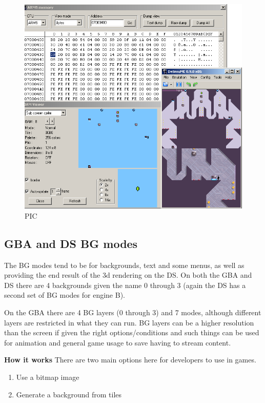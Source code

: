 \documentclass[
]{book}
\providecommand{\tightlist}{%
  \setlength{\itemsep}{0pt}\setlength{\parskip}{0pt}}
\begin{document}
\begin{figure}
\centering
\includegraphics{images/34_home_fast6191_romhackingguide_unrenamed_file___ginal_borders_romhackingguide2dOAMdesmume_2.png}
\caption{PIC}
\end{figure}

\hypertarget{gba-and-ds-bg-modes}{%
\subsection{GBA and DS BG modes}\label{gba-and-ds-bg-modes}}

The BG modes tend to be for backgrounds, text and some menus, as well as providing the end result of the 3d rendering on the DS. On both the GBA and DS there are 4 backgrounds given the name 0 through 3 (again the DS has a second set of BG modes for engine B).

On the GBA there are 4 BG layers (0 through 3) and 7 modes, although different layers are restricted in what they can run. BG layers can be a higher resolution than the screen if given the right options/conditions and such things can be used for animation and general game usage to save having to stream content.

\textbf{How it works} There are two main options here for developers to use in games.

\begin{enumerate}
\def\labelenumi{\arabic{enumi}.}
\tightlist
\item
  Use a bitmap image
\item
  Generate a background from tiles
\end{enumerate}
\end{document}
